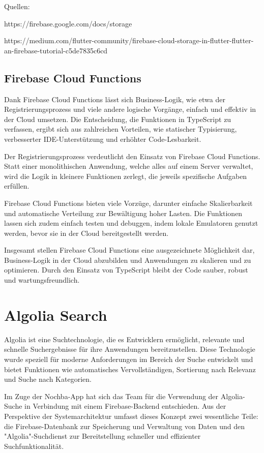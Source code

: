 Quellen:

https://firebase.google.com/docs/storage

https://medium.com/flutter-community/firebase-cloud-storage-in-flutter-flutter-an-firebase-tutorial-c5de7835c6cd

\subsection{Firebase Cloud Functions}
Dank Firebase Cloud Functions\cite{firebase-cloud-functions} lässt sich Business-Logik, wie etwa der Registrierungsprozess und viele andere logische Vorgänge, einfach und effektiv in der Cloud umsetzen. Die Entscheidung, die Funktionen in TypeScript zu verfassen, ergibt sich aus zahlreichen Vorteilen, wie statischer Typisierung, verbesserter IDE-Unterstützung und erhöhter Code-Lesbarkeit.

Der Registrierungsprozess verdeutlicht den Einsatz von Firebase Cloud Functions. Statt einer monolithischen Anwendung, welche alles auf einem Server verwaltet, wird die Logik in kleinere Funktionen zerlegt, die jeweils spezifische Aufgaben erfüllen.

Firebase Cloud Functions bieten viele Vorzüge, darunter einfache Skalierbarkeit und automatische Verteilung zur Bewältigung hoher Lasten. Die Funktionen lassen sich zudem einfach testen und debuggen, indem lokale Emulatoren genutzt werden, bevor sie in der Cloud bereitgestellt werden.

Insgesamt stellen Firebase Cloud Functions eine ausgezeichnete Möglichkeit dar, Business-Logik in der Cloud abzubilden und Anwendungen zu skalieren und zu optimieren. Durch den Einsatz von TypeScript bleibt der Code sauber, robust und wartungsfreundlich.

\section{Algolia Search}\label{sec:algolia}

Algolia ist eine Suchtechnologie, die es Entwicklern ermöglicht, relevante und schnelle Suchergebnisse für ihre Anwendungen bereitzustellen. Diese Technologie wurde speziell für moderne Anforderungen im Bereich der Suche entwickelt und bietet Funktionen wie automatisches Vervollständigen, Sortierung nach Relevanz und Suche nach Kategorien.

Im Zuge der Nochba-App hat sich das Team für die Verwendung der Algolia-Suche in Verbindung mit einem Firebase-Backend entschieden. Aus der Perspektive der Systemarchitektur umfasst dieses Konzept zwei wesentliche Teile: die Firebase-Datenbank zur Speicherung und Verwaltung von Daten und den "Algolia"-Suchdienst zur Bereitstellung schneller und effizienter Suchfunktionalität.

